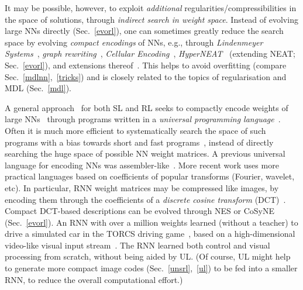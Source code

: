 \documentclass[letterpaper]{article}
\begin{document}
\begin{sloppypar}
It may be possible, however, to exploit {\em additional} regularities/compressibilities 
in the space of solutions, through {\em indirect search in weight space}.
Instead of evolving large NNs directly (Sec.~\ref{evorl}), one can sometimes greatly reduce
the search space by evolving 
{\em compact encodings} of NNs, e.g.,  through  {\em Lindenmeyer Systems}~\citep{lindenmayer68,lindenmayer94}, {\em graph rewriting}~\citep{kitano90}, {\em Cellular Encoding}~\citep{gruau:tr96-048}, {\em HyperNEAT}~\citep{stanley07,stanley09,clune2011,vandenberg2013} (extending
NEAT; Sec.~\ref{evorl}), and extensions thereof~\citep[e.g.,][]{risi2012}. 
This helps to avoid overfitting (compare Sec.~\ref{mdlnn},~\ref{tricks}) and is 
closely related to the topics of regularisation 
and MDL (Sec.~\ref{mdl}).

A general approach~\citep{Schmidhuber:97nn+} for both SL and RL seeks to compactly encode weights of large NNs~\citep{Schmidhuber:97nn+} through programs written in a {\em universal programming language}~\citep{Goedel:31,Church:36,Turing:36,Post:36}. Often it is much more efficient to systematically search the space of such programs with a bias towards short and fast 
programs~\citep{Levin:73,Schmidhuber:97nn+,Schmidhuber:04oops}, 
instead of directly 
searching the huge space of possible NN weight matrices.
A previous 
universal language for encoding NNs  was assembler-like~\citep{Schmidhuber:97nn+}. More recent work uses more practical languages based on coefficients of popular transforms (Fourier, wavelet, etc). 
In particular, 
 RNN weight matrices may be compressed like images, by encoding them through the coefficients of a 
{\em discrete cosine transform} (DCT)~\citep{koutnik:gecco10,koutnik:gecco13}.
Compact DCT-based descriptions can be evolved through NES or CoSyNE
(Sec.~\ref{evorl}).
An RNN with over a million weights learned (without a teacher) to drive a simulated car 
in the TORCS driving game~\citep{wcci:torcs:09,torcs-manual:2011},
based on a high-dimensional video-like visual input stream~\citep{koutnik:gecco13}.
The RNN learned both control and visual processing from scratch, without being
aided by UL. (Of course, UL might help to generate more compact image codes
(Sec.~\ref{unsrl},~\ref{ul})
 to be fed into a smaller RNN, 
to reduce the overall computational effort.) 


\end{sloppypar}
\end{document}

